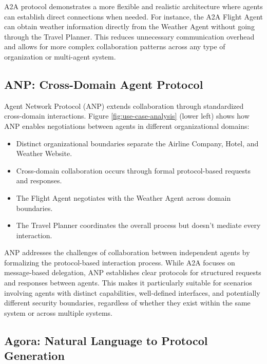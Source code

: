 \documentclass[10pt,preprint]{article}
\begin{document}
A2A protocol demonstrates a more flexible and realistic architecture where agents can establish direct connections when needed. For instance, the A2A Flight Agent can obtain weather information directly from the Weather Agent without going through the Travel Planner. This reduces unnecessary communication overhead and allows for more complex collaboration patterns across any type of organization or multi-agent system.

\subsection{ANP: Cross-Domain Agent Protocol}

Agent Network Protocol (ANP) extends collaboration through standardized cross-domain interactions. Figure \ref{fig:use-case-analysis} (lower left) shows how ANP enables negotiations between agents in different organizational domains:
\begin{itemize}
    \item Distinct organizational boundaries separate the Airline Company, Hotel, and Weather Website.
    \item Cross-domain collaboration occurs through formal protocol-based requests and responses.
    \item The Flight Agent negotiates with the Weather Agent across domain boundaries.
    \item The Travel Planner coordinates the overall process but doesn't mediate every interaction.
\end{itemize}


ANP addresses the challenges of collaboration between independent agents by formalizing the protocol-based interaction process. While A2A focuses on message-based delegation, ANP establishes clear protocols for structured requests and responses between agents. This makes it particularly suitable for scenarios involving agents with distinct capabilities, well-defined interfaces, and potentially different security boundaries, regardless of whether they exist within the same system or across multiple systems.

\subsection{Agora: Natural Language to Protocol Generation}
\end{document}
